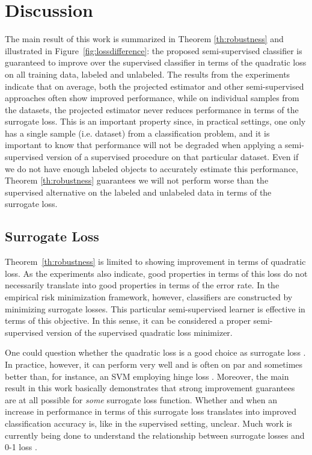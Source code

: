 \documentclass[sts,preprint]{imsart-custom}
\begin{document}
\section{Discussion}
The main result of this work is summarized in Theorem \ref{th:robustness} and illustrated in Figure~\ref{fig:lossdifference}: the proposed semi-supervised classifier is guaranteed to improve over the supervised classifier in terms of the quadratic loss on all training data, labeled and unlabeled. The results from the experiments indicate that on average, both the projected estimator and other semi-supervised approaches often show improved performance, while on individual samples from the datasets, the projected estimator never reduces performance in terms of the surrogate loss. This is an important property since, in practical settings, one only has a single sample (i.e. dataset) from a classification problem, and it is important to know that performance will not be degraded when applying a semi-supervised version of a supervised procedure on that particular dataset. Even if we do not have enough labeled objects to accurately estimate this performance, Theorem \ref{th:robustness} guarantees we will not perform worse than the supervised alternative on the labeled and unlabeled data in terms of the surrogate loss. 

\subsection{Surrogate Loss}
Theorem~\ref{th:robustness} is limited to showing improvement in terms of quadratic loss. As the experiments also indicate, good properties in terms of this loss do not necessarily translate into good properties in terms of the error rate. In the empirical risk minimization framework, however, classifiers are constructed by minimizing surrogate losses. This particular semi-supervised learner is effective in terms of this objective. In this sense, it can be considered a proper semi-supervised version of the supervised quadratic loss minimizer.

One could question whether the quadratic loss is a good choice as surrogate loss \citep{Ben-David2012}. In practice, however, it can perform very well and is often on par and sometimes better than, for instance, an SVM employing hinge loss \citep{Rasmussen2005,Hastie2009,Poggio2003}. Moreover, the main result in this work basically demonstrates that strong improvement guarantees are at all possible for \emph{some} surrogate loss function. Whether and when an increase in performance in terms of this surrogate loss translates into improved classification accuracy is, like in the supervised setting, unclear. Much work is currently being done to understand the relationship between surrogate losses and 0-1 loss \citep{Bartlett2006, Ben-David2012}. 
\end{document}
